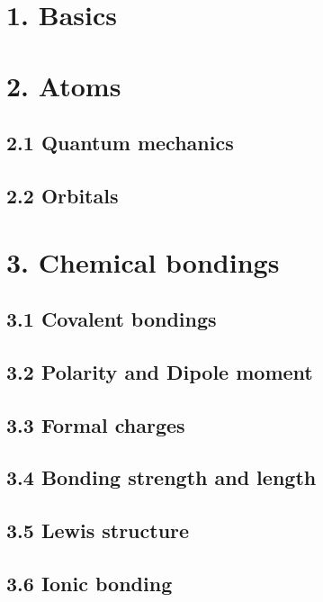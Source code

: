 \documentclass{cheatsheet}
\author{Noa Sendlhofer \& Christian Leser \\ nsendlhofer \& cleser}
\begin{document}
\section{1. Basics} %
	
\vfill \null \columnbreak

\section{2. Atoms} %
	\subsection{2.1 Quantum mechanics}
	
	\subsection{2.2 Orbitals}
	

\section{3. Chemical bondings} %
	\subsection{3.1 Covalent bondings}
	
	\subsection{3.2 Polarity and Dipole moment}
	
	\subsection{3.3 Formal charges}
	
	\subsection{3.4 Bonding strength and length}
	
	\subsection{3.5 Lewis structure}
	
	\subsection{3.6 Ionic bonding}
	
\end{document}
